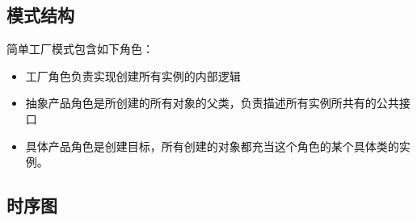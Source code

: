 \documentclass[letterpaper,10pt,english]{sphinxmanual}
\begin{document}
\subsection{模式结构}
\label{\detokenize{creational_patterns/simple_factory:id4}}
\sphinxAtStartPar
简单工厂模式包含如下角色：
\begin{itemize}
\item {} \begin{description}
\sphinxAtStartPar
工厂角色负责实现创建所有实例的内部逻辑

\end{description}

\item {} \begin{description}
\sphinxAtStartPar
抽象产品角色是所创建的所有对象的父类，负责描述所有实例所共有的公共接口

\end{description}

\item {} \begin{description}
\sphinxAtStartPar
具体产品角色是创建目标，所有创建的对象都充当这个角色的某个具体类的实例。

\end{description}

\end{itemize}

\noindent{}


\subsection{时序图}
\label{\detokenize{creational_patterns/simple_factory:id5}}
\noindent{}
\end{document}

